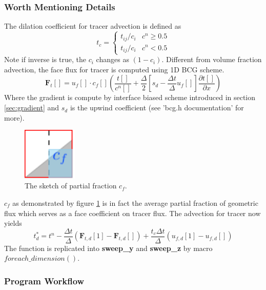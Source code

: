\documentclass[a4paper]{article}
\newcommand{\func}[1]{\textbf{\textcolor{function}{#1}}}
\begin{document}
\subsubsection{Worth Mentioning Details}
The dilation coefficient for tracer advection is defined as 
\begin{equation}\label{equ:tcoef}
    t_c=\left\{
    \begin{array}{cc}
        t_{ij}/c_i & c^n\geq0.5 \\
        t_{ij}/c_i & c^n<0.5
    \end{array}
    \right.
\end{equation}
Note if inverse is true, the $c_i$ changes as $(1-c_i)$. Different from volume fraction advection, the face flux for tracer is computed using 1D BCG scheme.
\begin{equation}\label{equ:bcgflux}
    \mathbf{F}_t[] = u_f[]\cdot c_f[](\frac{t[]}{c^n[]}+\frac{\Delta}{2}[s_d-\frac{\Delta t}{\Delta}u_f[]]\frac{\partial t[]}{\partial x})
\end{equation}
Where the gradient is compute by interface biased scheme introduced in section \ref{sec:gradient} and $s_d$ is the upwind coefficient (see 'bcg.h documentation' for more).
\begin{figure}[!htbp]
    \centering
    \includegraphics[height=2.5cm]{image/cf.pdf}
    \caption{The sketch of partial fraction $c_f$.}
    \label{fig:cfcompute}
\end{figure}
$c_f$ as demonstrated by figure \ref{fig:cfcompute} is in fact the average partial fraction of geometric flux which serves as a face coefficient on tracer flux. The advection for tracer now yields
\begin{equation}\label{equ:traceradv}
    t^\ast_d = t^n - \frac{\Delta t}{\Delta}(\mathbf{F}_{t,d}[1]-\mathbf{F}_{t,d}[]) + \frac{t_c\Delta t}{\Delta}(u_{f,d}[1]-u_{f,d}[])
\end{equation}
The function is replicated into \func{sweep\_y} and \func{sweep\_z} by macro $foreach\_dimension()$.

\subsubsection{Program Workflow}
\end{document}
